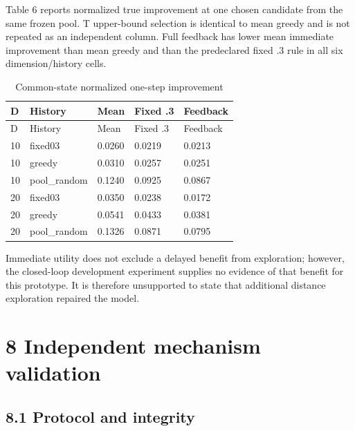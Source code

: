 \documentclass[11pt,a4paper]{article}
\begin{document}
Table 6 reports normalized true improvement at one chosen candidate from
the same frozen pool. T upper-bound selection is identical to mean
greedy and is not repeated as an independent column. Full feedback has
lower mean immediate improvement than mean greedy and than the
predeclared fixed .3 rule in all six dimension/history cells.

\par\noindent\begin{minipage}{\linewidth}

\begin{longtable}[]{@{}lllll@{}}
\caption{Common-state normalized one-step improvement}\tabularnewline
\toprule
D & History & Mean & Fixed .3 & Feedback \\
\midrule
\endfirsthead
\toprule
D & History & Mean & Fixed .3 & Feedback \\
\midrule
\endhead
10 & fixed03 & 0.0260 & 0.0219 & 0.0213 \\
10 & greedy & 0.0310 & 0.0257 & 0.0251 \\
10 & pool\_random & 0.1240 & 0.0925 & 0.0867 \\
20 & fixed03 & 0.0350 & 0.0238 & 0.0172 \\
20 & greedy & 0.0541 & 0.0433 & 0.0381 \\
20 & pool\_random & 0.1326 & 0.0871 & 0.0795 \\
\bottomrule
\end{longtable}

\end{minipage}\par

Immediate utility does not exclude a delayed benefit from exploration;
however, the closed-loop development experiment supplies no evidence of
that benefit for this prototype. It is therefore unsupported to state
that additional distance exploration repaired the model.

\hypertarget{independent-mechanism-validation}{%
\section{8 Independent mechanism
validation}\label{independent-mechanism-validation}}

\hypertarget{protocol-and-integrity}{%
\subsection{8.1 Protocol and integrity}\label{protocol-and-integrity}}
\end{document}
